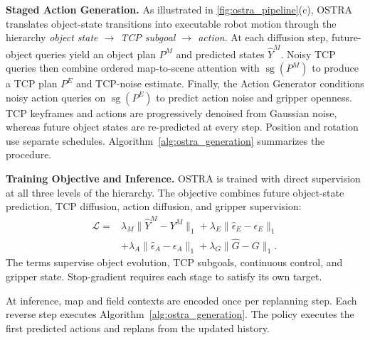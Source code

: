 \textbf{Staged Action Generation.}
As illustrated in \cref{fig:ostra_pipeline}(c), OSTRA translates
object-state transitions into executable robot motion through the hierarchy
\emph{object state $\rightarrow$ TCP subgoal $\rightarrow$ action}.
At each diffusion step, future-object queries yield an object plan $P^{M}$ and
predicted states $\widehat{Y}^{M}$. Noisy TCP queries then combine ordered
map-to-scene attention with $\operatorname{sg}(P^{M})$ to produce a TCP plan
$P^{E}$ and TCP-noise estimate. Finally, the Action Generator conditions noisy
action queries on $\operatorname{sg}(P^{E})$ to predict action noise and
gripper openness. TCP
keyframes and actions are progressively denoised from Gaussian noise, whereas
future object states are re-predicted at every step. Position and rotation use
separate schedules. Algorithm~\ref{alg:ostra_generation} summarizes the procedure.


\textbf{Training Objective and Inference.}
OSTRA is trained with direct supervision at all three levels of the hierarchy.
The objective combines future object-state prediction, TCP diffusion, action
diffusion, and gripper supervision:
\begin{equation}
\begin{split}
    \mathcal{L} ={}&
    \lambda_M
    \lVert\widehat{Y}^{M}-Y^{M}\rVert_1
    +
    \lambda_E
    \lVert\widehat{\epsilon}_{E}-\epsilon_E\rVert_1 \\
    &+
    \lambda_A
    \lVert\widehat{\epsilon}_{A}-\epsilon_A\rVert_1
    +
    \lambda_G
    \lVert\widehat{G}-G\rVert_1 .
\end{split}
\label{eq:total_loss}
\end{equation}
The terms supervise object evolution, TCP subgoals, continuous control, and
gripper state. Stop-gradient requires each stage to satisfy its own target.

At inference, map and field contexts are encoded once per replanning step. Each
reverse step executes Algorithm~\ref{alg:ostra_generation}. The policy
executes the first predicted actions and replans from the updated history.

